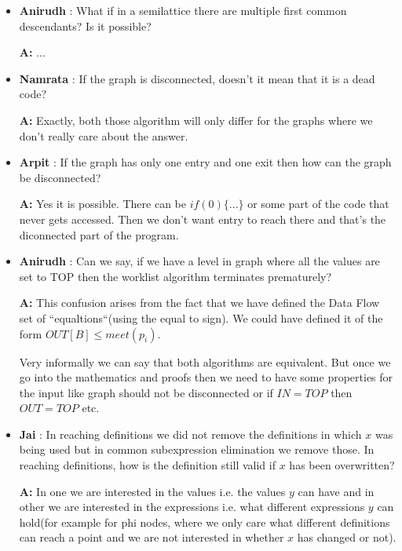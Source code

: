 \begin{itemize}
    \item \textbf{Anirudh} : What if in a semilattice there are multiple first common descendants? Is it possible?
    
        \textbf{A:} ...
        
    \item \textbf{Namrata} : If the graph is disconnected, doesn't it mean that it is a dead code?
            
            \textbf{A:} Exactly, both those algorithm will only differ for the graphs where we don't really care about the answer.

    \item \textbf{Arpit} : If the graph has only one entry and one exit then how can the graph be disconnected?
            
            \textbf{A:} Yes it is possible. There can be $if(0)\{ ...\}$ or some part of the code that never gets accessed. Then we don't want entry to reach there and that's the diconnected part of the program.

    \item \textbf{Anirudh} : Can we say, if we have a level in graph where all the values are set to TOP then the worklist algorithm terminates prematurely?
    
            \textbf{A:} This confusion arises from the fact that we have defined the Data Flow set of ``equaltions``(using the equal to sign). We could have defined it of the form $OUT[B]\leq meet(p_i)$.
            
            Very informally we can say that both algorithms are equivalent. But once we go into the mathematics and proofs then we need to have some properties for the input like graph should not be disconnected or if $IN=TOP$ then $OUT=TOP$ etc.

    \item \textbf{Jai} : In reaching definitions we did not remove the definitions in which $x$ was being used but in common subexpression elimination we remove those. In reaching definitions, how is the definition still valid if $x$ has been overwritten?
            
            \textbf{A:} In one we are interested in the values i.e. the values $y$ can have and in other we are interested in the expressions i.e. what different expressions $y$ can hold(for example for phi nodes, where we only care what different definitions can reach a point and we are not interested in whether $x$ has changed or not).


\end{itemize}
